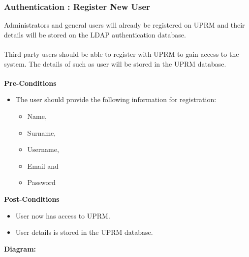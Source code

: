 \subsubsection{Authentication : Register New User}
Administrators and general users will already be registered on UPRM and their details will be stored on the LDAP authentication database.\\ \\
Third party users should be able to register with UPRM to gain access to the system. The details of such as user will be stored in the UPRM database.\\ \\
\textbf{Pre-Conditions}
\begin{itemize}
	\item The user should provide the following information for registration:
	\begin{itemize}
		\item Name,
		\item Surname,
		\item Username,
		\item Email and
		\item Password \\
	\end{itemize}
\end{itemize}
\textbf{Post-Conditions}
\begin{itemize}
	\item User now has access to UPRM.
	\item User details is stored in the UPRM database.\\
\end{itemize}
\textbf{Diagram:}\\
\centerline{}
